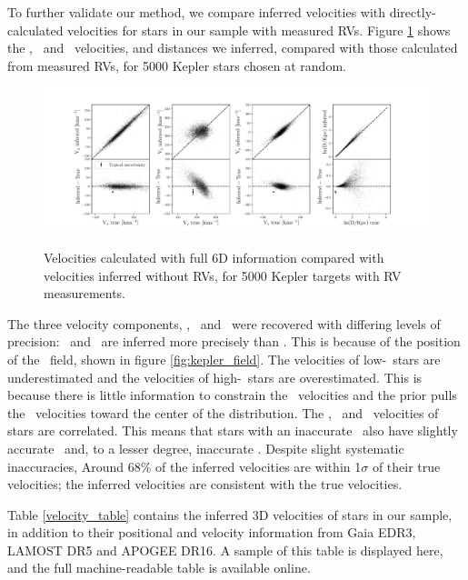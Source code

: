 To further validate our method, we compare inferred velocities with
directly-calculated velocities for stars in our sample with measured RVs.
Figure \ref{fig:residuals} shows the \vx, \vy\ and \vz\ velocities, and
distances we inferred, compared with those calculated from measured RVs, for
5000 Kepler stars chosen at random.
\begin{figure}[ht!]
\caption{Velocities calculated with full 6D information compared with
    velocities inferred without RVs, for 5000 Kepler targets with RV
    measurements.}
  \centering
    \includegraphics[width=1\textwidth]{residuals}
\label{fig:residuals}
\end{figure}

The three velocity components, \vx, \vy\ and \vz\ were recovered with
differing levels of precision: \vx\ and \vz\ are inferred more precisely than
\vy.
This is because of the position of the \kepler\ field, shown in figure
\ref{fig:kepler_field}.
The velocities of low-\vy\ stars are underestimated and the velocities of
high-\vy\ stars are overestimated.
This is because there is little information to constrain the \vy\ velocities
and the prior pulls the \vy\ velocities toward the center of the distribution.
The \vx, \vy\ and \vz\ velocities of stars are correlated.
This means that stars with an inaccurate \vy\ also have slightly accurate \vz\
and, to a lesser degree, inaccurate \vx.
Despite slight systematic inaccuracies, Around 68\% of the inferred velocities
are within 1$\sigma$ of their true velocities; the inferred velocities are
consistent with the true velocities.

Table \ref{velocity_table} contains the inferred 3D velocities of stars in our
sample, in addition to their positional and velocity information from
Gaia EDR3, LAMOST DR5 and APOGEE DR16.
A sample of this table is displayed here, and the full machine-readable table
is available online.


